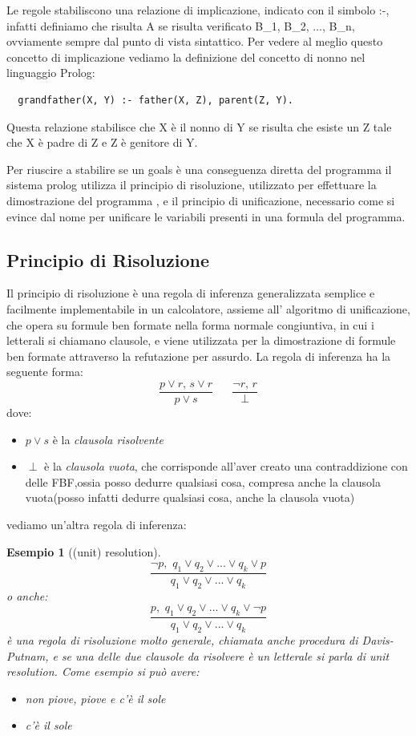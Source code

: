 \documentclass[a4paper]{report}
\newtheorem{esempio}{Esempio}
\begin{document}
Le regole stabiliscono una relazione di implicazione, indicato con il simbolo :-, infatti definiamo che risulta A se risulta verificato
B_1, B_2, $\dots$, B_n, ovviamente sempre dal punto di vista sintattico.
Per vedere al meglio questo concetto di implicazione vediamo la definizione del concetto di nonno nel linguaggio Prolog:
\begin{verbatim}
  grandfather(X, Y) :- father(X, Z), parent(Z, Y).
\end{verbatim}
Questa relazione stabilisce che X è il nonno di Y se risulta che esiste un Z tale che X è padre di Z e Z è genitore di Y.

Per riuscire a stabilire se un goals è una conseguenza diretta del programma il sistema prolog utilizza il principio di risoluzione,
utilizzato per effettuare la dimostrazione del programma , e il principio di unificazione, necessario come si evince dal nome per
unificare le variabili presenti in una formula del programma.

\subsection{Principio di Risoluzione}
Il principio di risoluzione è una regola di inferenza generalizzata semplice e facilmente implementabile in un calcolatore, assieme all'
algoritmo di unificazione, che opera su formule ben formate nella forma normale congiuntiva, in cui i letterali si chiamano clausole,
e viene utilizzata per la dimostrazione di formule ben formate attraverso la refutazione per assurdo.
La regola di inferenza ha la seguente forma:
$$\frac{p\vee r,\, s\lor r}{p\vee s}\,\,\,\,\,\,\,\,\,\,\frac{\neg r,\, r}{\perp}$$
dove:
\begin{itemize}
\item $p \lor  s$ è la \textit{clausola risolvente}
\item $\perp$ è la \textit{clausola vuota}, che corrisponde all'aver creato una contraddizione con delle FBF,ossia posso dedurre qualsiasi cosa,
       compresa anche la clausola vuota(posso infatti dedurre qualsiasi cosa, anche la clausola vuota)
\end{itemize}

vediamo un'altra regola di inferenza:
\begin{esempio}[(unit) resolution]
$$\frac{\neg p,\,\, q_1\vee q_2\vee ... \vee q_k \vee p}{q_1\vee q_2\vee ... \vee q_k}$$
o anche:
$$\frac{p,\,\, q_1\vee q_2\vee ... \vee q_k \vee \neg p}{q_1\vee q_2\vee ... \vee q_k}$$
è una regola di risoluzione molto generale, chiamata anche procedura di Davis-Putnam, e se una delle due clausole da risolvere
è un \textit{letterale} si parla di \emph{unit resolution}.\newline
Come esempio si può avere:
\begin{itemize}
\item non piove, piove e c'è il sole
\item c'è il sole
\end{itemize}
\end{esempio}
\end{document}
